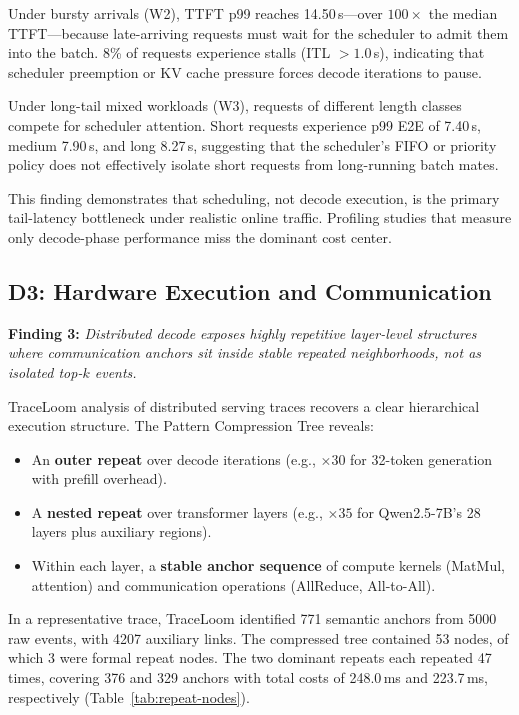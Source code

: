\documentclass[conference]{IEEEtran}
\begin{document}
Under bursty arrivals (W2), TTFT p99 reaches 14.50\,s---over $100\times$ the
median TTFT---because late-arriving requests must wait for the scheduler to
admit them into the batch. 8\% of requests experience stalls (ITL $> 1.0$\,s),
indicating that scheduler preemption or KV cache pressure forces decode
iterations to pause.

Under long-tail mixed workloads (W3), requests of different length classes
compete for scheduler attention. Short requests experience p99 E2E of 7.40\,s,
medium 7.90\,s, and long 8.27\,s, suggesting that the scheduler's FIFO or
priority policy does not effectively isolate short requests from long-running
batch mates.

This finding demonstrates that scheduling, not decode execution, is the
primary tail-latency bottleneck under realistic online traffic. Profiling
studies that measure only decode-phase performance miss the dominant cost
center.

\subsection{D3: Hardware Execution and Communication}
\label{sec:execution}

\textbf{Finding 3:} \emph{Distributed decode exposes highly repetitive
layer-level structures where communication anchors sit inside stable repeated
neighborhoods, not as isolated top-$k$ events.}

TraceLoom analysis of distributed serving traces recovers a clear hierarchical
execution structure. The Pattern Compression Tree reveals:

\begin{itemize}
\item An \textbf{outer repeat} over decode iterations (e.g., $\times 30$ for
32-token generation with prefill overhead).
\item A \textbf{nested repeat} over transformer layers (e.g., $\times 35$ for
Qwen2.5-7B's 28 layers plus auxiliary regions).
\item Within each layer, a \textbf{stable anchor sequence} of compute kernels
(MatMul, attention) and communication operations (AllReduce, All-to-All).
\end{itemize}

In a representative trace, TraceLoom identified 771 semantic anchors from 5000
raw events, with 4207 auxiliary links. The compressed tree contained 53 nodes,
of which 3 were formal repeat nodes. The two dominant repeats each repeated
47 times, covering 376 and 329 anchors with total costs of 248.0\,ms and
223.7\,ms, respectively (Table~\ref{tab:repeat-nodes}).
\end{document}
